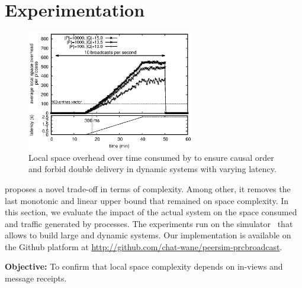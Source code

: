 
\section{Experimentation}
\label{sec:experimentation}

\begin{figure}
  \begin{center}
    \includegraphics[width=0.65\textwidth]{./img/overhead.eps}
    \caption{\label{fig:overhead}Local space overhead over time consumed by
      \RPCBROADCAST to ensure causal order and forbid double delivery in dynamic
      systems with varying latency.}
  \end{center}
\end{figure}


\RPCBROADCAST proposes a novel trade-off in terms of complexity. Among other,
it removes the last monotonic and linear upper bound that remained on space
complexity. In this section, we evaluate the impact of the actual system on the
space consumed and traffic generated by processes. The experiments run on the
\PEERSIM simulator~\cite{montresor2009peersim} that allows to build large and
dynamic systems. Our implementation is available on the Github platform at
\url{http://github.com/chat-wane/peersim-prcbroadcast}. 


%   

\noindent \textbf{Objective:} To confirm that local space complexity
depends on in-views and message receipts.

